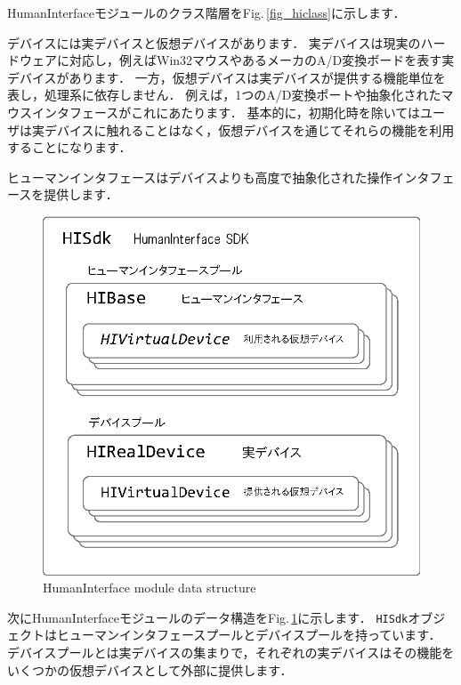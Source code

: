 HumanInterfaceモジュールのクラス階層をFig.\,\ref{fig_hiclass}に示します．

\KLUDGE デバイスには実デバイスと仮想デバイスがあります．
\KLUDGE 実デバイスは現実のハードウェアに対応し，例えばWin32マウスやあるメーカのA/D変換ボードを表す実デバイスがあります．
\KLUDGE 一方，仮想デバイスは実デバイスが提供する機能単位を表し，処理系に依存しません．
\KLUDGE 例えば，1つのA/D変換ポートや抽象化されたマウスインタフェースがこれにあたります．
\KLUDGE 基本的に，初期化時を除いてはユーザは実デバイスに触れることはなく，仮想デバイスを通じてそれらの機能を利用することになります．

\KLUDGE ヒューマンインタフェースはデバイスよりも高度で抽象化された操作インタフェースを提供します．


\begin{figure}[t]
\begin{center}
\includegraphics[width=.5\hsize]{fig/humaninterface.eps}
\end{center}
\caption{HumanInterface module data structure}
\label{fig_humaninterface}
\end{figure}

\KLUDGE 次にHumanInterfaceモジュールのデータ構造をFig.\,\ref{fig_humaninterface}に示します．
\texttt{HISdk}オブジェクトはヒューマンインタフェースプールとデバイスプールを持っています．
\KLUDGE デバイスプールとは実デバイスの集まりで，それぞれの実デバイスはその機能をいくつかの仮想デバイスとして外部に提供します．

